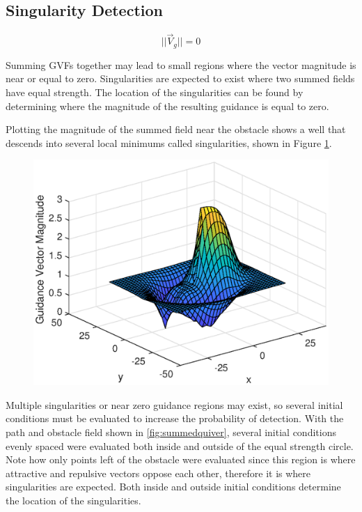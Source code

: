 \documentclass[conf]{new-aiaa}
\begin{document}
\subsection{Singularity Detection}
\begin{equation}
\label{eq:singularityCondition}
||\overrightarrow{V}_g || = 0
\end{equation}

Summing GVFs together may lead to small regions where the vector magnitude is near or equal to zero. Singularities are expected to exist where two summed fields have equal strength. The location of the singularities can be found by determining where the magnitude of the resulting guidance is equal to zero.


Plotting the magnitude of the summed field near the obstacle shows a well that descends into several local minimums called singularities, shown in Figure \ref{fig:summedmagnitudesurf}.


\begin{figure}[H]
	\centering
	\includegraphics[width=0.7\linewidth]{Figures/methods/summedMagnitudeSurf}
	\caption{}
	\label{fig:summedmagnitudesurf}
\end{figure}

 Multiple singularities or near zero guidance regions may exist, so several initial conditions must be evaluated to increase the probability of detection. With the path and obstacle field shown in \ref{fig:summedquiver}, several initial conditions evenly spaced were evaluated both inside and outside of the equal strength circle. Note how only points left of the obstacle were evaluated since this region is where attractive and repulsive vectors oppose each other, therefore it is where singularities are expected. Both inside and outside initial conditions determine the location of the singularities. 
\end{document}
